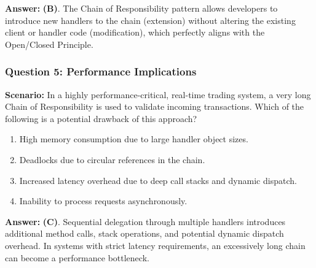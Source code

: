 \textbf{Answer:} \textbf{(B)}. The Chain of Responsibility pattern allows developers to introduce new handlers to the chain (extension) without altering the existing client or handler code (modification), which perfectly aligns with the Open/Closed Principle.

\subsubsection*{Question 5: Performance Implications}
\textbf{Scenario:} In a highly performance-critical, real-time trading system, a very long Chain of Responsibility is used to validate incoming transactions. Which of the following is a potential drawback of this approach?

\begin{enumerate}[label=(\Alph*)]
    \item High memory consumption due to large handler object sizes.
    \item Deadlocks due to circular references in the chain.
    \item Increased latency overhead due to deep call stacks and dynamic dispatch.
    \item Inability to process requests asynchronously.
\end{enumerate}

\textbf{Answer:} \textbf{(C)}. Sequential delegation through multiple handlers introduces additional method calls, stack operations, and potential dynamic dispatch overhead. In systems with strict latency requirements, an excessively long chain can become a performance bottleneck.